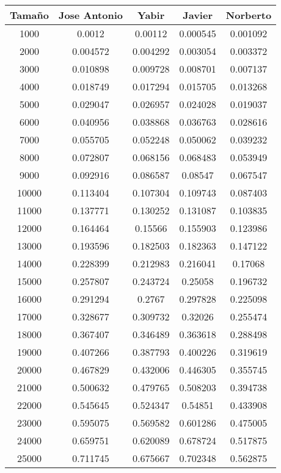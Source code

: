 \documentclass{article}
\begin{document}
\newpage
{}

\begin{tabular}{ | c | c  | c | c | c | }
  \hline
   Tama\~no & Jose Antonio & Yabir & Javier & Norberto\\ 
   \hline
1000	&	0.0012	&	0.00112	&	0.000545	&	0.001092	\\
2000	&	0.004572	&	0.004292	&	0.003054	&	0.003372	\\
3000	&	0.010898	&	0.009728	&	0.008701	&	0.007137	\\
4000	&	0.018749	&	0.017294	&	0.015705	&	0.013268	\\
5000	&	0.029047	&	0.026957	&	0.024028	&	0.019037	\\
6000	&	0.040956	&	0.038868	&	0.036763	&	0.028616	\\
7000	&	0.055705	&	0.052248	&	0.050062	&	0.039232	\\
8000	&	0.072807	&	0.068156	&	0.068483	&	0.053949	\\
9000	&	0.092916	&	0.086587	&	0.08547	&	0.067547	\\
10000	&	0.113404	&	0.107304	&	0.109743	&	0.087403	\\
11000	&	0.137771	&	0.130252	&	0.131087	&	0.103835	\\
12000	&	0.164464	&	0.15566	&	0.155903	&	0.123986	\\
13000	&	0.193596	&	0.182503	&	0.182363	&	0.147122	\\
14000	&	0.228399	&	0.212983	&	0.216041	&	0.17068	\\
15000	&	0.257807	&	0.243724	&	0.25058	&	0.196732	\\
16000	&	0.291294	&	0.2767	&	0.297828	&	0.225098	\\
17000	&	0.328677	&	0.309732	&	0.32026	&	0.255474	\\
18000	&	0.367407	&	0.346489	&	0.363618	&	0.288498	\\
19000	&	0.407266	&	0.387793	&	0.400226	&	0.319619	\\
20000	&	0.467829	&	0.432006	&	0.446305	&	0.355745	\\
21000	&	0.500632	&	0.479765	&	0.508203	&	0.394738	\\
22000	&	0.545645	&	0.524347	&	0.54851	&	0.433908	\\
23000	&	0.595075	&	0.569582	&	0.601286	&	0.475005	\\
24000	&	0.659751	&	0.620089	&	0.678724	&	0.517875	\\
25000	&	0.711745	&	0.675667	&	0.702348	&	0.562875	\\

  \hline
 \end{tabular}
 
\end{document}
